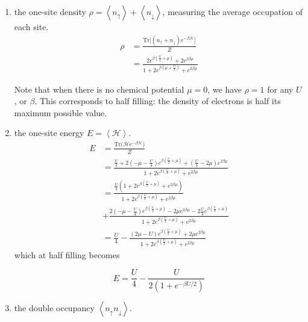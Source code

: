\documentclass[10pt, twocolumn, twoside]{article}
\begin{document}
\begin{enumerate}
\item the one-site density $\rho = \left\langle n_\uparrow \right\rangle + \left\langle n_\downarrow \right\rangle$, measuring the average occupation of each site.
\begin{equation}
\begin{split}
\rho &= \frac{\text{Tr} \big[ (n_\uparrow + n_\downarrow ) e^{-\beta\mathcal{H}} \big]}{Z} \\
&= \frac{2 e^{\beta(\frac{U}{2} + \mu)} + 2 e^{2\beta\mu}}{1 + 2 e^{\beta(\mu + \frac{U}{2})} + e^{2 \beta \mu}}
\end{split}
\end{equation}

Note that when there is no chemical potential $\mu = 0$, we have $\rho = 1$ for any $U$, or $\beta$. This corresponds to half filling: the density of electrons is half its maximum possible value.

\item the one-site energy $E = \left\langle \mathcal{H} \right\rangle$.
\begin{equation}
\begin{split}
E &= \frac{\text{Tr}\bigg( \mathcal{H}e^{-\beta\mathcal{H} } \bigg)}{Z} \\
&= \frac{ \frac{U}{4} + 2 ( -\mu - \frac{U}{4} ) e^{\beta(\frac{U}{2} + \mu )} + (\frac{U}{4} - 2\mu ) e^{2\beta\mu}}{1 + 2 e^{\beta (\frac{U}{2} + \mu )} + e^{2\beta\mu} } \\
&= \frac{ \frac{U}{4} ( 1 + 2 e^{\beta (\frac{U}{2} + \mu )} + e^{2\beta\mu} )}{1 + 2 e^{\beta (\frac{U}{2} + \mu )} + e^{2\beta\mu} } \\
&+ \frac{2(-\mu - \frac{U}{4}) e^{\beta(\frac{U}{2} + \mu)} - 2\mu e^{2\beta\mu} - 2\frac{U}{4} e^{\beta (\frac{U}{2} + \mu)} }{1 + 2 e^{\beta (\frac{U}{2} + \mu )} + e^{2\beta\mu}} \\
&= \frac{U}{4} - \frac{ (2\mu - U) e^{\beta(\frac{U}{2} + \mu) } + 2\mu e^{2\beta\mu} }{1 + 2 e^{\beta (\frac{U}{2} + \mu )} + e^{2\beta\mu} }
\end{split}
\end{equation}
which at half filling becomes

\begin{equation}
E = \frac{U}{4} - \frac{U}{2 ( 1 + e^{-\beta U /2} )}
\end{equation}

\item the double occupancy $\left\langle n_\uparrow n_\downarrow \right\rangle$.


\end{enumerate}
\end{document}
